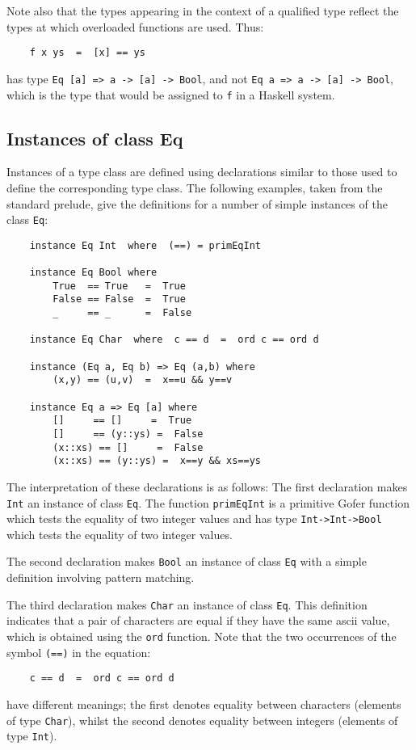Note also that the types appearing in the context of a  qualified  type
reflect the types at which overloaded functions are used.  Thus:
\begin{verbatim}
    f x ys  =  [x] == ys
\end{verbatim}
has type  \verb"Eq [a] => a -> [a] -> Bool", 
and not \verb"Eq a => a -> [a] -> Bool",
which is the type that would be assigned to \verb"f" in a Haskell system.


\subsection{Instances of class Eq}
Instances of a type class are defined  using  declarations  similar  to
those used to define  the  corresponding  type  class.   The  following
examples, taken from the standard prelude, give the definitions  for  a
number of simple instances of the class \verb"Eq":
\begin{verbatim}
    instance Eq Int  where  (==) = primEqInt

    instance Eq Bool where
        True  == True   =  True
        False == False  =  True
        _     == _      =  False

    instance Eq Char  where  c == d  =  ord c == ord d

    instance (Eq a, Eq b) => Eq (a,b) where
        (x,y) == (u,v)  =  x==u && y==v

    instance Eq a => Eq [a] where
        []     == []     =  True
        []     == (y::ys) =  False
        (x::xs) == []     =  False
        (x::xs) == (y::ys) =  x==y && xs==ys
\end{verbatim}
The interpretation of these declarations is as follows:
\BI
\IT  The first declaration  makes \verb"Int" an instance  of  
     class  \verb"Eq".   The
     function \verb"primEqInt" is a primitive Gofer function which tests the
     equality of two integer values and has type \verb"Int->Int->Bool"
     which tests the equality of two integer values.

\IT  The second declaration makes  \verb"Bool" an 
     instance of  class \verb"Eq" with a
     simple definition involving pattern matching.

\IT  The third declaration makes \verb"Char" 
     an instance of  class  \verb"Eq".   This
     definition indicates that a pair of characters are equal  if  they
     have the same {\sc ascii} value,  
     which  is  obtained  using  the  \verb"ord"
     function.  Note that the two occurrences of the symbol \verb"(==)" in the
     equation:
\begin{verbatim}
    c == d  =  ord c == ord d
\end{verbatim}
     have  different  meanings;  the  first  denotes  equality  between
     characters (elements of type  \verb"Char"),  whilst  the  second  denotes
     equality between integers (elements of type \verb"Int").

